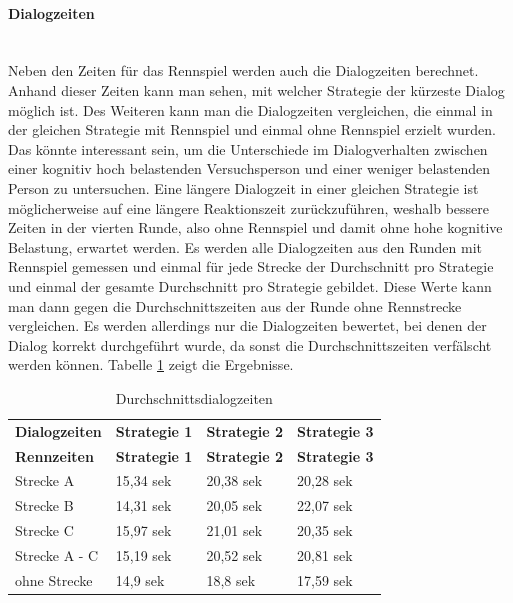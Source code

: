 \documentclass[12pt,a4paper]{scrartcl}
\begin{document}
\paragraph{Dialogzeiten}
~\\
Neben den Zeiten für das Rennspiel werden auch die Dialogzeiten berechnet. Anhand dieser Zeiten kann man sehen, mit welcher Strategie der kürzeste Dialog möglich ist. Des Weiteren kann man die Dialogzeiten vergleichen, die einmal in der gleichen Strategie mit Rennspiel und einmal ohne Rennspiel erzielt wurden. Das könnte interessant sein, um die Unterschiede im Dialogverhalten zwischen einer kognitiv hoch belastenden Versuchsperson und einer weniger belastenden Person zu untersuchen. Eine längere Dialogzeit in einer gleichen Strategie ist möglicherweise auf eine längere Reaktionszeit zurückzuführen, weshalb bessere Zeiten in der vierten Runde, also ohne Rennspiel und damit ohne hohe kognitive Belastung, erwartet werden. Es werden alle Dialogzeiten aus den Runden mit Rennspiel gemessen und einmal für jede Strecke der Durchschnitt pro Strategie und einmal der gesamte Durchschnitt pro Strategie gebildet. Diese Werte kann man dann gegen die Durchschnittszeiten aus der Runde ohne Rennstrecke vergleichen. Es werden allerdings nur die Dialogzeiten bewertet, bei denen der Dialog korrekt durchgeführt wurde, da sonst die Durchschnittszeiten verfälscht werden können.  Tabelle \ref{Durchschnittsdialogzeiten1} zeigt die Ergebnisse.

\begin{longtable}{p{3cm}p{3cm}p{3cm}p{3cm} }
	\label{Durchschnittsdialogzeiten1}\\
	\caption[Durchschnittsdialogzeiten]{Durchschnittsdialogzeiten}\\
	\hline
	\textbf{Dialogzeiten}&\textbf{Strategie 1}&\textbf{Strategie 2} &\textbf{Strategie 3}\\
	\hline
	\endfirsthead
	\hline
	\textbf{Rennzeiten}&\textbf{Strategie 1}&\textbf{Strategie 2} &\textbf{Strategie 3}\\
	\hline
	\endhead
Strecke A & 15,34 sek & 20,38 sek & 20,28 sek \\
Strecke B & 14,31 sek & 20,05 sek & 22,07 sek \\
Strecke C  & 15,97 sek & 21,01 sek & 20,35 sek \\
\hline
\hline
Strecke A - C & 15,19 sek & 20,52 sek & 20,81 sek \\
\hline
ohne Strecke &  14,9 sek & 18,8 sek & 17,59 sek \\
\hline
\end{longtable}
\end{document}
